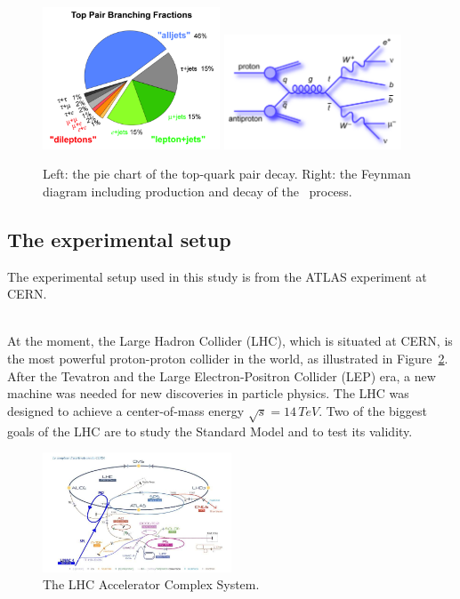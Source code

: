 \begin{figure}[h]
  \centering
  \includegraphics[width=0.47\textwidth]{../presentation/plots/ttbar_5.png}
  \includegraphics[width=0.47\textwidth]{../presentation/plots/ttbar_4.png}
  \caption{Left: the pie chart of the top-quark pair decay. Right: the Feynman diagram including production and decay of the \ttbaremu~process.}
  \label{fig:TopQuarkDecay}
\end{figure}

\subsection{The experimental setup}
\label{sec:ExperimentalSetup}

The experimental setup used in this study is from the ATLAS experiment at CERN.

\ \\At the moment, the Large Hadron Collider (LHC), which is situated at CERN, is the most powerful proton-proton collider in the world, as illustrated in Figure~\ref{fig:LHC}. After the Tevatron and the Large Electron-Positron Collider (LEP) era, a new machine was needed for new discoveries in particle physics. The LHC was designed to achieve a center-of-mass energy $\sqrt{s}=14\,TeV$. Two of the biggest goals of the LHC are to study the Standard Model and to test its validity.  

\begin{figure}[h]
  \centering
  \includegraphics[width=0.5\textwidth]{plots/LHC.png} 
  \caption{The LHC Accelerator Complex System.}
  \label{fig:LHC}
\end{figure}

